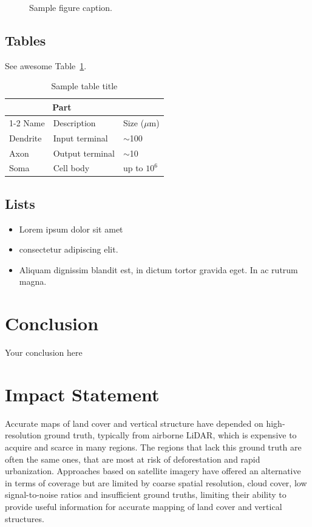 \documentclass{article}
\begin{document}
\begin{figure}
  \centering
  \fbox{\rule[-.5cm]{4cm}{4cm} \rule[-.5cm]{4cm}{0cm}}
  \caption{Sample figure caption.}
  \label{fig:fig1}
\end{figure}

\subsection{Tables}
\lipsum[12]
See awesome Table~\ref{tab:table}.

\begin{table}
 \caption{Sample table title}
  \centering
  \begin{tabular}{lll}
    \toprule
    \multicolumn{2}{c}{Part}                   \\
    \cmidrule(r){1-2}
    Name     & Description     & Size ($\mu$m) \\
    \midrule
    Dendrite & Input terminal  & $\sim$100     \\
    Axon     & Output terminal & $\sim$10      \\
    Soma     & Cell body       & up to $10^6$  \\
    \bottomrule
  \end{tabular}
  \label{tab:table}
\end{table}

\subsection{Lists}

\begin{itemize}
\item Lorem ipsum dolor sit amet
\item consectetur adipiscing elit. 
\item Aliquam dignissim blandit est, in dictum tortor gravida eget. In ac rutrum magna.
\end{itemize}


\section{Conclusion}
Your conclusion here

\section{Impact Statement}
\label{sec:impact}

Accurate maps of land cover and vertical structure have depended on high-resolution ground truth, typically from airborne LiDAR, which is expensive to acquire and scarce in many regions.
The regions that lack this ground truth are often the same ones, that are most at risk of deforestation and rapid urbanization. 
Approaches based on satellite imagery have offered an alternative in terms of coverage but are limited by coarse spatial resolution, cloud cover, low signal-to-noise ratios and insufficient ground truths, limiting their ability to provide useful information for accurate mapping of land cover and vertical structures.
\end{document}

